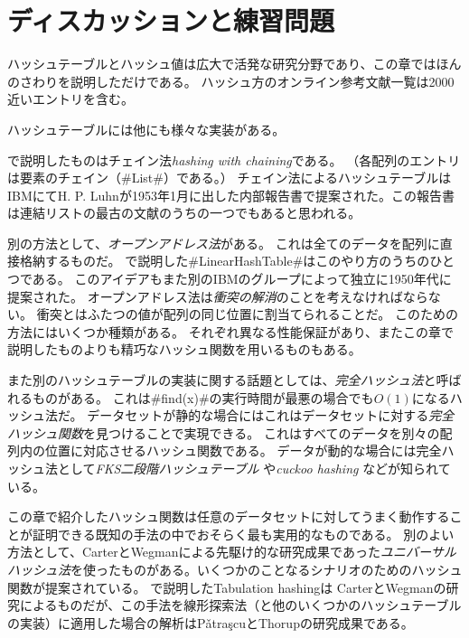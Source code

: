 \section{ディスカッションと練習問題}

ハッシュテーブルとハッシュ値は広大で活発な研究分野であり、この章ではほんのさわりを説明しただけである。
ハッシュ方のオンライン参考文献一覧は\cite{hashing}2000近いエントリを含む。

ハッシュテーブルには他にも様々な実装がある。

で説明したものはチェイン法\emph{hashing with chaining}である。%
（各配列のエントリは要素のチェイン（#List#）である。）
チェイン法によるハッシュテーブルはIBMにてH. P. Luhnが1953年1月に出した内部報告書で提案された。この報告書は連結リストの最古の文献のうちの一つでもあると思われる。

%
別の方法として、\emph{オープンアドレス法}がある。
これは全てのデータを配列に直接格納するものだ。
で説明した#LinearHashTable#はこのやり方のうちのひとつである。
このアイデアもまた別のIBMのグループによって独立に1950年代に提案された。
オープンアドレス法は\emph{衝突の解消}のことを考えなければならない。
%
衝突とはふたつの値が配列の同じ位置に割当てられることだ。
このための方法にはいくつか種類がある。
それぞれ異なる性能保証があり、またこの章で説明したものよりも精巧なハッシュ関数を用いるものもある。

また別のハッシュテーブルの実装に関する話題としては、\emph{完全ハッシュ法}と呼ばれるものがある。
%
これは#find(x)#の実行時間が最悪の場合でも$O(1)$になるハッシュ法だ。
データセットが静的な場合にはこれはデータセットに対する\emph{完全ハッシュ関数}を見つけることで実現できる。
%
%
これはすべてのデータを別々の配列内の位置に対応させるハッシュ関数である。
データが動的な場合には完全ハッシュ法として\emph{FKS二段階ハッシュテーブル}
%
%
\cite{fks84,dkkmrt94}
や\emph{cuckoo hashing} \cite{pr04}などが知られている。
%
%

この章で紹介したハッシュ関数は任意のデータセットに対してうまく動作することが証明できる既知の手法の中でおそらく最も実用的なものである。
別のよい方法として、CarterとWegmanによる先駆け的な研究成果であった\emph{ユニバーサルハッシュ法}を使ったものがある。いくつかのことなるシナリオのためのハッシュ関数が提案されている。\cite{cw79}
%
%
で説明したTabulation hashingは
CarterとWegmanの研究\cite{cw79}によるものだが、この手法を線形探索法（と他のいくつかのハッシュテーブルの実装）に適用した場合の解析はP\v{a}tra\c{s}cuとThorupの研究成果である。\cite{pt12}

